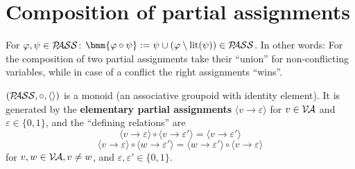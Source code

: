 \documentclass[12pt]{book}
\begin{document}
\section{Composition of partial assignments}
\label{sec:Compositionpass}

\begin{defi}\label{def:comppass}
      For $\varphi, \psi \in \mathcal{P\hspace{-0.32em}ASS}$: $\bmm{\vp \circ \psi} := \psi \cup (\vp \sm \lit(\psi)) \in \Pass$.
      In other words: For the composition of two partial assignments take their ``union'' for non-conflicting variables, while in case of a 
	  conflict the right assignments ``wins''.
\end{defi}
\begin{lem}\label{lem:passmon}
      $(\mathcal{P\hspace{-0.32em}ASS},\circ,\langle  \rangle)$ is a monoid (an associative groupoid with identity element). It is generated by 
      the \textbf{elementary partial assignments} $\langle v\to \varepsilon\rangle$ for $v\in \mathcal{V\hspace{-0.1em}A}$ and $\varepsilon \in \{0,1\}$, and the ``defining relations'' are
      $$\langle v\to \varepsilon \rangle \circ \langle v\to \varepsilon' \rangle = \langle v\to \varepsilon' \rangle $$
      $$\langle v\to \varepsilon \rangle \circ \langle w\to \varepsilon' \rangle = \langle w\to \varepsilon' \rangle \circ \langle v\to \varepsilon \rangle$$
      for $v, w\in \mathcal{V\hspace{-0.1em}A}, v\neq w$, and $\varepsilon, \varepsilon' \in \{0, 1\}$.
\end{lem}
\end{document}
